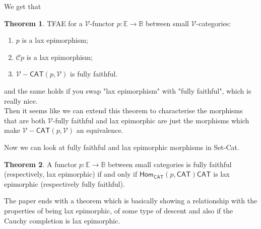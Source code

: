 \documentclass{article}
\numberwithin{equation}{section}
\theoremstyle{definition}
\newtheorem{thm}{Theorem}[section]
\theoremstyle{definition}
\theoremstyle{remark}
\theoremstyle{remark}
\begin{document}
	We get that 
	\begin{thm}
		TFAE for a $ \mathcal{V}$-functor $ p: \mathbb{E} \longrightarrow \mathbb{B}$ between small $ \mathcal{V}$-categories:
		\begin{enumerate}
			\item $p$ is a lax epimorphism;
			\item $ \mathcal{C}p$ is a lax epimorphism;
			\item $ \mathcal{V}-\textsf{CAT}(p, \mathcal{V})$ is fully faithful.
		\end{enumerate}

		and the same holds if you swap "lax epimorphism" with "fully faithful", which is really nice.\\

		Then it seems like we can extend this theorem to characterise the morphisms that are both $ \mathcal{V}$-fully faithful and lax epimorphic are just the morphisms which make $ \mathcal{V}-\textsf{CAT}(p, \mathcal{V})$ an equivalence.

		
	\end{thm}
	
	Now we can look at fully faithful and lax epimorphic morphisms in \textsf{Set-Cat}.

	\begin{thm} A functor $ p: \mathbb{E} \longrightarrow \mathbb{B}$ between small categories is fully faithful (respectively, lax epimorphic) if and only if $ \textsf{Hom}_{ \textsf{CAT}}(p, \textsf{CAT}) \textsf{CAT}$ is lax epimorphic (respectively fully faithful).

		
	\end{thm}
	
	The paper ends with a theorem which is basically showing a relationship with the properties of being lax epimorphic, of some type of descent and also if the Cauchy completion is lax epimorphic.	
\end{document}
